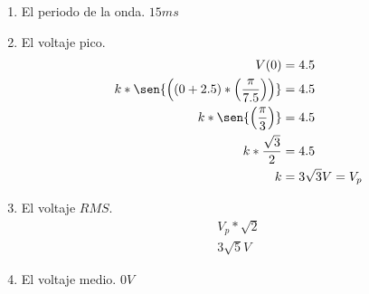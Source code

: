 \documentclass[../main.tex]{subfiles}
\begin{document}
\begin{enumerate}[label=\alph*)]
	\item El periodo de la onda.
		\subitem $15ms$
	\item El voltaje pico.
		\begin{align*}
			V(0) &= 4.5\\
			k*\sen
			{
				\left(
					(0+2.5)*
					\left(
						\frac{\pi}{7.5}
					\right)
				\right)
		} &= 4.5\\
		k*\sen
		{
			\left(
				\frac{\pi}{3}
			\right)
		} &= 4.5\\
		k* \frac{\sqrt{3}}{2}  &= 4.5\\
		k &= 3\sqrt{3}V = V_p
		\end{align*}
	\item El voltaje $RMS$.
		\begin{align*}
			V_p * \sqrt{2}\\
			3\sqrt{5}V
		\end{align*}
	\item El voltaje medio.
		\subitem $0V$
\end{enumerate}
\end{document}
